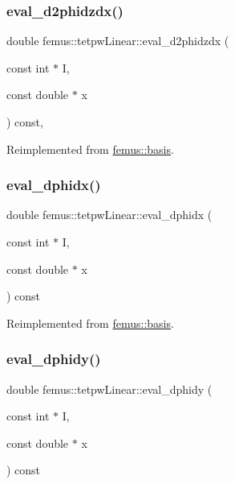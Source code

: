 \subsubsection{\texorpdfstring{eval\+\_\+d2phidzdx()}{eval\_d2phidzdx()}}
{\footnotesize\ttfamily double femus\+::tetpw\+Linear\+::eval\+\_\+d2phidzdx (\begin{DoxyParamCaption}\item[{const int $\ast$}]{I,  }\item[{const double $\ast$}]{x }\end{DoxyParamCaption}) const\hspace{0.3cm}{\ttfamily [inline]}, {\ttfamily [virtual]}}



Reimplemented from \mbox{\hyperlink{classfemus_1_1basis_a5d619ec5bd57b7d2dc34a99d69975c77}{femus\+::basis}}.

\mbox{\label{classfemus_1_1tetpw_linear_a2a3c74824c709f2919aa9b0a8681d17e}} 
\subsubsection{\texorpdfstring{eval\+\_\+dphidx()}{eval\_dphidx()}}
{\footnotesize\ttfamily double femus\+::tetpw\+Linear\+::eval\+\_\+dphidx (\begin{DoxyParamCaption}\item[{const int $\ast$}]{I,  }\item[{const double $\ast$}]{x }\end{DoxyParamCaption}) const\hspace{0.3cm}{\ttfamily [virtual]}}



Reimplemented from \mbox{\hyperlink{classfemus_1_1basis_a4db7d29cf8a753ddbccc4a297dafa0bf}{femus\+::basis}}.

\mbox{\label{classfemus_1_1tetpw_linear_a75d4cc96948c8b36119ce628e2803783}} 
\subsubsection{\texorpdfstring{eval\+\_\+dphidy()}{eval\_dphidy()}}
{\footnotesize\ttfamily double femus\+::tetpw\+Linear\+::eval\+\_\+dphidy (\begin{DoxyParamCaption}\item[{const int $\ast$}]{I,  }\item[{const double $\ast$}]{x }\end{DoxyParamCaption}) const\hspace{0.3cm}{\ttfamily [virtual]}}



